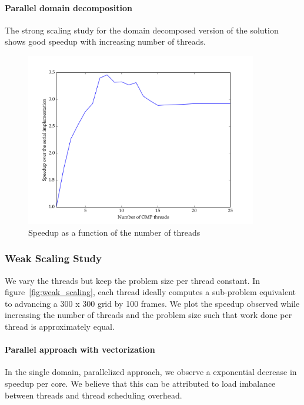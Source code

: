 \documentclass[11pt]{article}
\begin{document}
\paragraph{Parallel domain decomposition}

The strong scaling study for the domain decomposed version of the solution shows good speedup with increasing number of threads.

\begin{figure}[H]
    \includegraphics[width=0.9\textwidth]{./strong_scaling/strong_scaling.png}
    \caption{Speedup as a function of the number of threads}
    \label{fig:strong_scaling_dd}
\end{figure} 


\subsubsection{Weak Scaling Study}

We vary the threads but keep the problem size per thread constant. In figure~\ref{fig:weak_scaling}, each thread ideally computes a sub-problem equivalent to advancing a 300 x 300 grid by 100 frames. We 
plot the speedup observed while increasing the number of threads and the problem size such that work done per thread is approximately equal. 

\paragraph{Parallel approach with vectorization}

In the single domain, parallelized approach, we observe a exponential decrease in speedup per core. We believe that this can be attributed to load imbalance between threads and thread scheduling overhead. 
\end{document}
